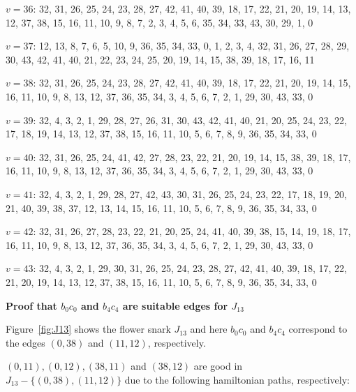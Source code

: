 \documentclass{amcjoucc}
\begin{document}
\begin{itemize}
{\item $v = 36$: 32, 31, 26, 25, 24, 23, 28, 27, 42, 41, 40, 39, 18, 17, 22, 21, 20, 19, 14, 13, 12, 37, 38, 15, 16, 11, 10, 9, 8, 7, 2, 3, 4, 5, 6, 35, 34, 33, 43, 30, 29, 1, 0
\item $v = 37$: 12, 13, 8, 7, 6, 5, 10, 9, 36, 35, 34, 33, 0, 1, 2, 3, 4, 32, 31, 26, 27, 28, 29, 30, 43, 42, 41, 40, 21, 22, 23, 24, 25, 20, 19, 14, 15, 38, 39, 18, 17, 16, 11
\item $v = 38$: 32, 31, 26, 25, 24, 23, 28, 27, 42, 41, 40, 39, 18, 17, 22, 21, 20, 19, 14, 15, 16, 11, 10, 9, 8, 13, 12, 37, 36, 35, 34, 3, 4, 5, 6, 7, 2, 1, 29, 30, 43, 33, 0
\item $v = 39$: 32, 4, 3, 2, 1, 29, 28, 27, 26, 31, 30, 43, 42, 41, 40, 21, 20, 25, 24, 23, 22, 17, 18, 19, 14, 13, 12, 37, 38, 15, 16, 11, 10, 5, 6, 7, 8, 9, 36, 35, 34, 33, 0
\item $v = 40$: 32, 31, 26, 25, 24, 41, 42, 27, 28, 23, 22, 21, 20, 19, 14, 15, 38, 39, 18, 17, 16, 11, 10, 9, 8, 13, 12, 37, 36, 35, 34, 3, 4, 5, 6, 7, 2, 1, 29, 30, 43, 33, 0
\item $v = 41$: 32, 4, 3, 2, 1, 29, 28, 27, 42, 43, 30, 31, 26, 25, 24, 23, 22, 17, 18, 19, 20, 21, 40, 39, 38, 37, 12, 13, 14, 15, 16, 11, 10, 5, 6, 7, 8, 9, 36, 35, 34, 33, 0
\item $v = 42$: 32, 31, 26, 27, 28, 23, 22, 21, 20, 25, 24, 41, 40, 39, 38, 15, 14, 19, 18, 17, 16, 11, 10, 9, 8, 13, 12, 37, 36, 35, 34, 3, 4, 5, 6, 7, 2, 1, 29, 30, 43, 33, 0
\item $v = 43$: 32, 4, 3, 2, 1, 29, 30, 31, 26, 25, 24, 23, 28, 27, 42, 41, 40, 39, 18, 17, 22, 21, 20, 19, 14, 13, 12, 37, 38, 15, 16, 11, 10, 5, 6, 7, 8, 9, 36, 35, 34, 33, 0
}
\end{itemize}


\noindent
\textbf{Proof that $b_0c_0$ and $b_4c_4$ are suitable edges for $J_{13}$}

Figure~\ref{fig:J13} shows the flower snark $J_{13}$ and here $b_0c_0$ and $b_4c_4$ correspond to the edges $(0,38)$ and $(11, 12)$, respectively.

$(0,11), (0,12), (38,11)$ and $(38,12)$ are good in $J_{13} - \{(0,38),(11,12)\}$ due to the following hamiltonian paths, respectively:
\end{document}
